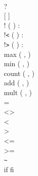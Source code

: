 \documentclass[a4,14pt,latin1]{article}
\begin{document}
{\begin{tabbing}
          \>   \>  \OR \\
          \>   \> ?\ \OR \\
          \>   \> [  ]\OR \\
          \>   \>! (  )  :\ \OR \\
          \>   \>!\verb"<" (  )  :\ \OR \\
          \>   \>!\verb">" (  )  :\ \OR \\
          \>   \>max (  ,  )\OR \\
          \>   \>min (  ,  )\OR \\
          \>   \>count (  ,  )\OR \\
          \>   \>add (  ,  )\OR \\
          \>   \>mult (  ,  )\OR \\
          \>   \> = \OR \\
          \>   \> <> \OR \\
          \>   \> < \OR \\
          \>   \> > \OR \\
          \>   \> <= \OR \\
          \>   \> >= \OR \\
          \>   \> \verb"~" \OR \\
          \>   \>if  fi\OR \\

\end{tabbing}}
\end{document}
